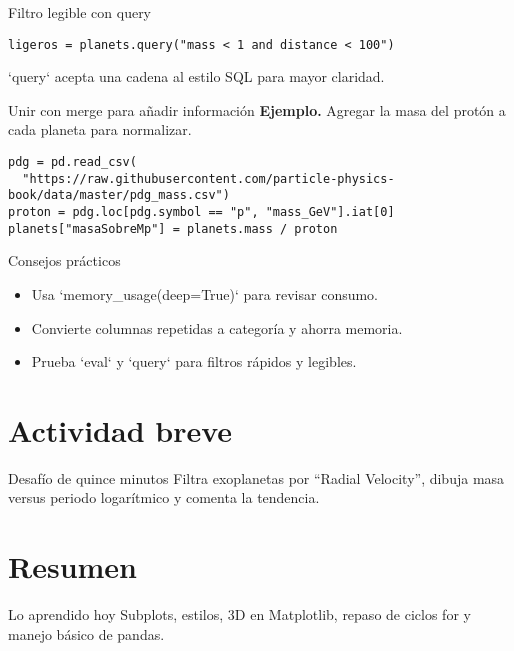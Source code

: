 \documentclass[10pt]{beamer}
\begin{document}
\begin{frame}[fragile]{Filtro legible con query}
\begin{verbatim}
ligeros = planets.query("mass < 1 and distance < 100")
\end{verbatim}
`query` acepta una cadena al estilo SQL para mayor claridad.
\end{frame}

\begin{frame}[fragile]{Unir con merge para añadir información}
\textbf{Ejemplo.} Agregar la masa del protón a cada planeta para normalizar.
\begin{verbatim}
pdg = pd.read_csv(
  "https://raw.githubusercontent.com/particle-physics-book/data/master/pdg_mass.csv")
proton = pdg.loc[pdg.symbol == "p", "mass_GeV"].iat[0]
planets["masaSobreMp"] = planets.mass / proton
\end{verbatim}
\end{frame}

\begin{frame}{Consejos prácticos}
\begin{itemize}
  \item Usa `memory\_usage(deep=True)` para revisar consumo.  
  \item Convierte columnas repetidas a categoría y ahorra memoria.  
  \item Prueba `eval` y `query` para filtros rápidos y legibles.
\end{itemize}
\end{frame}

\section{Actividad breve}
\begin{frame}{Desafío de quince minutos}
Filtra exoplanetas por “Radial Velocity”, dibuja masa versus periodo logarítmico y comenta la tendencia.
\end{frame}

\section{Resumen}
\begin{frame}{Lo aprendido hoy}
Subplots, estilos, 3D en Matplotlib, repaso de ciclos for y manejo básico de pandas.
\end{frame}
\end{document}
